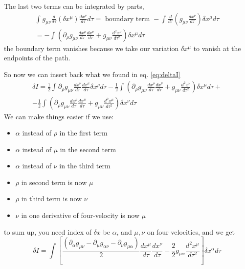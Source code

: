 The last two terms can be integrated by parts,
\begin{gather*}
	\int_{}^{}{g_{\mu \nu } \frac{d }{d \tau }\left( \delta x^{\mu } \right) \frac{d x^{\nu }}{d \tau } d\tau } = \text{ boundary term } - \int_{}^{}{\frac{d }{d \tau } \left( g_{\mu \nu }\frac{d x^{\nu }}{d \tau } \right) \delta x^{\mu } d\tau } \\
 = - \int_{}^{}{\left( \partial_{\rho }g_{\mu \nu } \frac{d x^{\rho }}{d \tau } \frac{d x^{\nu }}{d \tau } + g_{\mu \nu } \frac{d ^{2} x^{\nu }}{d \tau ^{2}} \right) \delta x^{\mu } d\tau }
\end{gather*}
the boundary term vanishes because we take our variation $\delta x^{\mu }$ to vanish at the endpoints of the path. \par
So now we can insert back what we found in eq. \ref{eq:deltaI}
\begin{gather*}
\delta I = \frac{1}{2} \int_{}^{}{\partial_{\rho }g_{\mu \nu } \frac{d x^{\nu }}{d \tau } \frac{d x^{\mu  }}{d \tau } \delta x^{\rho } d\tau } - \frac{1}{2} \int_{}^{}{\left( \partial_{\rho } g_{\mu \nu } \frac{d x^{\rho }}{d \tau } \frac{d x^{\nu }}{d \tau } + g_{\mu \nu } \frac{d ^{2}x^{\nu }}{d \tau ^{2}} \right) \delta x^{\mu }d\tau }  +\\
- \frac{1}{2} \int_{}^{}{\left( \partial_{\rho } g_{\mu \nu } \frac{d x^{\rho }}{d \tau } \frac{d x^{\mu }}{d \tau } + g_{\mu \nu } \frac{d ^{2} x^{\mu }}{d \tau ^{2}} \right) \delta x^{\nu } d\tau }
\end{gather*}
We can make things easier if we use:
\begin{itemize}
\item $\alpha $ instead of $\rho $ in the first term
\item $\alpha $ instead of $\mu $ in the second term
\item $\alpha $ instead of $\nu $ in the third term
\item $\rho $ in second term is now $\mu $
\item $\rho $ in third term is now $\nu $
\item $\nu $ in one derivative of four-velocity is now $\mu $
\end{itemize}
to sum up, you need index of $\delta x$ be $\alpha $, and $\mu ,\nu $ on four velocities, and we get
\begin{equation}
	\delta I = \int_{}^{}{ \left[ \frac{\left( \partial_{\alpha } g_{\mu \nu } - \partial_{\mu } g_{\alpha \nu } - \partial_{\nu }g_{\mu \alpha } \right)}{2} \frac{d x^{\mu }}{d \tau } \frac{d x^{\nu }}{d \tau } - \frac{2}{2} g_{\mu \alpha } \frac{d ^{2}x^{\mu }}{d \tau ^{2}} \right] \delta x^{\alpha }d\tau }
\end{equation}
